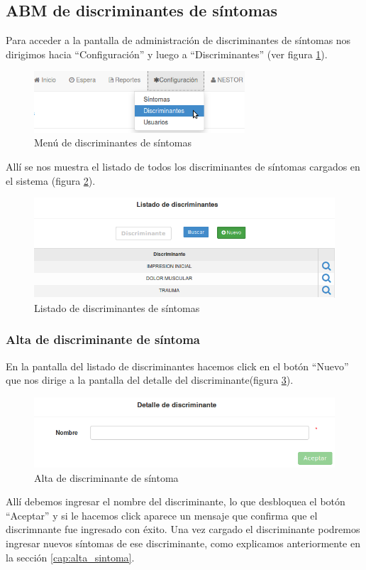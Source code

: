 \subsection{ABM de discriminantes de síntomas}\label{ABM_discriminantes}
Para acceder a la pantalla de administración de discriminantes de síntomas nos dirigimos hacia ``Configuración'' y luego a ``Discriminantes'' (ver figura \ref{fig:menu_discriminantes}).
\begin{figure}
\centerline{\includegraphics[width=0.7\textwidth]{menu_discriminantes.png}}
\caption{Menú de discriminantes de síntomas}
\label{fig:menu_discriminantes}
\end{figure}
Allí se nos muestra el listado de todos los discriminantes de síntomas cargados en el sistema (figura \ref{fig:listado_discriminantes}).
\begin{figure}
\centerline{\includegraphics[width=1\textwidth]{listado_discriminantes.png}}
\caption{Listado de discriminantes de síntomas}
\label{fig:listado_discriminantes}
\end{figure}

\subsubsection{Alta de discriminante de síntoma}\label{cap:alta_discriminante}
En la pantalla del listado de discriminantes hacemos click en el botón ``Nuevo'' que nos dirige a la pantalla del detalle del discriminante(figura \ref{fig:nuevo_discriminante}).
\begin{figure}
\centerline{\includegraphics[width=1\textwidth]{nuevo_discriminante.png}}
\caption{Alta de discriminante de síntoma}
\label{fig:nuevo_discriminante}
\end{figure}
Allí debemos ingresar el nombre del discriminante, lo que desbloquea el botón ``Aceptar'' y si le hacemos click aparece un mensaje que confirma que el discrimnante fue ingresado con éxito. Una vez cargado el discriminante podremos ingresar nuevos síntomas de ese discriminante, como explicamos anteriormente en la sección \ref{cap:alta_sintoma}.

